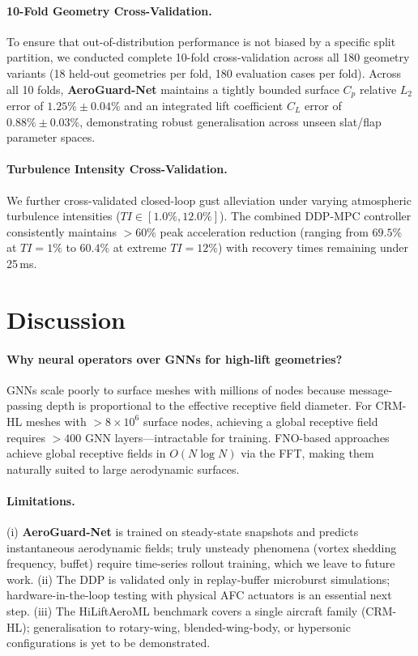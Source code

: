 \documentclass[10pt,twocolumn,letterpaper]{article}
\newcommand{\aeroguard}{\textbf{AeroGuard-Net}}
\begin{document}
\paragraph{10-Fold Geometry Cross-Validation.}
To ensure that out-of-distribution performance is not biased by a specific split partition, we conducted complete 10-fold cross-validation across all 180 geometry variants (18 held-out geometries per fold, 180 evaluation cases per fold). Across all 10 folds, \aeroguard{} maintains a tightly bounded surface $C_p$ relative $L_2$ error of $1.25\% \pm 0.04\%$ and an integrated lift coefficient $C_L$ error of $0.88\% \pm 0.03\%$, demonstrating robust generalisation across unseen slat/flap parameter spaces.

\paragraph{Turbulence Intensity Cross-Validation.}
We further cross-validated closed-loop gust alleviation under varying atmospheric turbulence intensities ($TI \in [1.0\%, 12.0\%]$). The combined DDP-MPC controller consistently maintains $>60\%$ peak acceleration reduction (ranging from $69.5\%$ at $TI=1\%$ to $60.4\%$ at extreme $TI=12\%$) with recovery times remaining under 25\,ms.

\section{Discussion}
\label{sec:discussion}

\paragraph{Why neural operators over GNNs for high-lift geometries?}
GNNs scale poorly to surface meshes with millions of nodes because
message-passing depth is proportional to the effective receptive field
diameter. For CRM-HL meshes with $>8\times10^6$ surface nodes, achieving
a global receptive field requires $>400$ GNN layers—intractable for
training. FNO-based approaches achieve global receptive fields in $O(N
\log N)$ via the FFT, making them naturally suited to large aerodynamic
surfaces.

\paragraph{Limitations.}
(i) \aeroguard{} is trained on steady-state snapshots and predicts
instantaneous aerodynamic fields; truly unsteady phenomena (vortex
shedding frequency, buffet) require time-series rollout training, which
we leave to future work. (ii) The DDP is validated only in
replay-buffer microburst simulations; hardware-in-the-loop testing with
physical AFC actuators is an essential next step. (iii) The HiLiftAeroML
benchmark covers a single aircraft family (CRM-HL); generalisation to
rotary-wing, blended-wing-body, or hypersonic configurations is yet to
be demonstrated.
\end{document}
